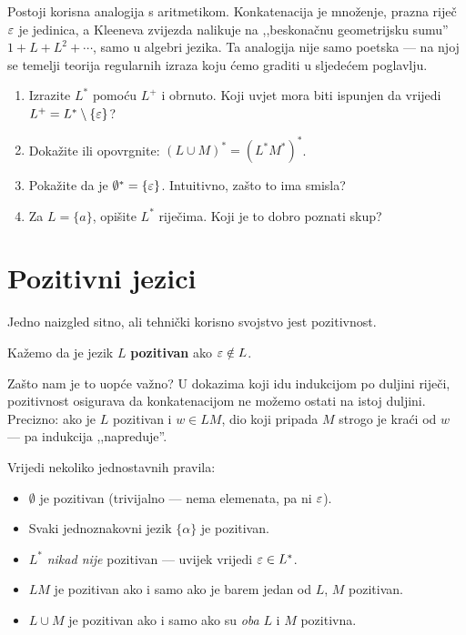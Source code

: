 Postoji korisna analogija s aritmetikom. Konkatenacija je množenje, prazna
riječ $\varepsilon$ je jedinica, a Kleeneva zvijezda nalikuje na ,,beskonačnu
geometrijsku sumu'' $1 + L + L^2 + \cdots$, samo u algebri jezika.
Ta analogija nije samo poetska --- na njoj se temelji teorija regularnih
izraza koju ćemo graditi u sljedećem poglavlju.

\begin{zadatak}
\begin{enumerate}[label=(\alph*), itemsep=4pt]
  \item Izrazite $L^*$ pomoću $L^+$ i obrnuto. Koji uvjet mora biti ispunjen
        da vrijedi $L^+ = L^* \setminus \{\varepsilon\}$?
  \item Dokažite ili opovrgnite: $(L \cup M)^* = (L^* M^*)^*$.
  \item Pokažite da je $\emptyset^* = \{\varepsilon\}$.
        Intuitivno, zašto to ima smisla?
  \item Za $L = \{a\}$, opišite $L^*$ riječima. Koji je to dobro poznati skup?
\end{enumerate}
\end{zadatak}

\section{Pozitivni jezici}

Jedno naizgled sitno, ali tehnički korisno svojstvo jest pozitivnost.

\begin{definicija}
Kažemo da je jezik $L$ \textbf{pozitivan} ako $\varepsilon \notin L$.
\end{definicija}

Zašto nam je to uopće važno? U dokazima koji idu indukcijom po duljini
riječi, pozitivnost osigurava da konkatenacijom ne možemo ostati na istoj
duljini. Precizno: ako je $L$ pozitivan i $w \in LM$, dio koji pripada $M$
strogo je kraći od $w$ --- pa indukcija ,,napreduje''.

Vrijedi nekoliko jednostavnih pravila:
\begin{itemize}[itemsep=3pt]
  \item $\emptyset$ je pozitivan (trivijalno --- nema elemenata, pa ni $\varepsilon$).
  \item Svaki jednoznakovni jezik $\{\alpha\}$ je pozitivan.
  \item $L^*$ \emph{nikad nije} pozitivan --- uvijek vrijedi $\varepsilon \in L^*$.
  \item $LM$ je pozitivan ako i samo ako je barem jedan od $L$, $M$ pozitivan.
  \item $L \cup M$ je pozitivan ako i samo ako su \emph{oba} $L$ i $M$ pozitivna.
\end{itemize}


